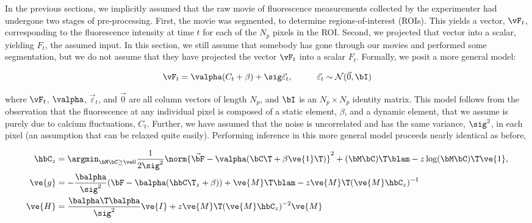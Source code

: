 In the previous sections, we implicitly assumed that the raw movie of fluorescence measurements collected by the experimenter had undergone two stages of pre-processing.  First, the movie was segmented, to determine regions-of-interest (ROIs).  This yields a vector, $\vF_t$, corresponding to the fluorescence intensity at time $t$ for each of the $N_p$ pixels in the ROI.  Second, we projected that vector into a scalar, yielding $F_t$, the assumed input.  In this section, we still assume that somebody has gone through our movies and performed some segmentation, but we do not assume that they have projected the vector $\vF_t$ into a scalar $F_t$.  Formally, we posit a more general model:

\begin{align} \label{eq:bF}
\vF_t &= \valpha (C_t + \beta) +  \sig \vec{\varepsilon}_t, \qquad &\vec{\varepsilon}_t \sim \mathcal{N}(\vec{0},\bI)   
\end{align}

\noindent where $\vF_t$, $\valpha$, $\vec{\varepsilon}_t$, and $\vec{0}$  are all column vectors of length $N_p$, and $\bI$ is an $N_p \times N_p$ identity matrix.  This model follows from the observation that the fluorescence at any individual pixel is composed of a static element, $\beta$, and a dynamic element, that we assume is purely due to calcium fluctuations, $C_t$.  Further, we have assumed that the noise is uncorrelated and has the same variance, $\sig^2$, in each pixel (an assumption that can be relaxed quite easily).  Performing inference in this more general model proceeds nearly identical as before, 

\begin{align} 
\hbC_{\zzz} 
&= \az  \frac{1}{2 \sig^2} \norm{\vec{\bF} - \valpha (\bC\T +\beta\ve{1}\T)}^2 + (\bM \bC )\T \blam  - \zzz \log(\bM \bC)\T\ve{1},  \label{eq:eta4}\\
\ve{g} &= -\frac{\balpha}{\sig^2}(\bF -\balpha({\hbC\T}_{\zzz} + \beta)) + \ve{M}\T\blam - \zzz \ve{M}\T (\ve{M} \hbC_{\zzz})^{-1} \label{eq:g2} \\
\ve{H} &= \frac{\balpha\T \balpha}{\sig^2} \ve{I} + \zzz \ve{M}\T (\ve{M} \hbC_{\zzz})^{-2} \ve{M} \label{eq:H2}
\end{align}

